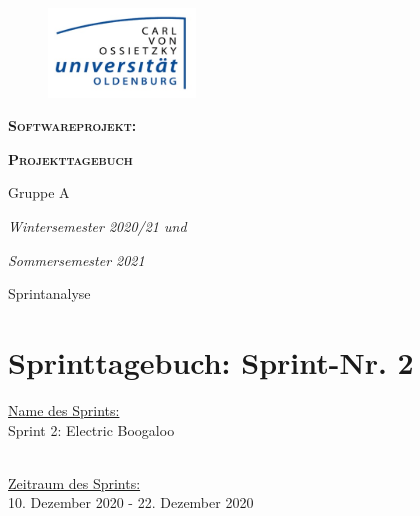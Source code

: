 \documentclass[12pt,a4paper, oneside]{article}
\author{Uni Oldenburg, SWP2020 Gruppe A}
\begin{document}
    \begin{titlepage}
        \pagestyle{empty}
        \begin{center}

            \begin{figure}[h]
                \centering
                \includegraphics[width=0.35\textwidth]{img/Logo.jpg}
            \end{figure}

            \bigskip \bigskip \noindent
            \textsc{\textbf{\LARGE Softwareprojekt:}} \par \bigskip \noindent
            \textsc{\textbf{\LARGE Projekttagebuch}}


            \par \bigskip \bigskip \bigskip \bigskip \bigskip \noindent
            {\Large Gruppe A} \par \medskip \noindent

            \par \bigskip \bigskip \bigskip \bigskip \bigskip \bigskip \noindent
            \textit{\Large Wintersemester 2020/21 und} \par \noindent
            \textit{\Large Sommersemester 2021}

            \par \bigskip \bigskip \bigskip \bigskip \bigskip \bigskip \noindent
            \par \bigskip \bigskip \bigskip \noindent
            {\Large Sprintanalyse} \par \medskip \noindent

        \end{center}
    \end{titlepage}

    \tableofcontents
    \pagebreak


    \section{Sprinttagebuch: Sprint-Nr. 2}
    \underline{Name des Sprints:}
    \\
    Sprint 2: Electric Boogaloo

    \noindent
    \\
    \underline{Zeitraum des Sprints:}
    \\
    10. Dezember 2020 - 22. Dezember 2020
\end{document}
